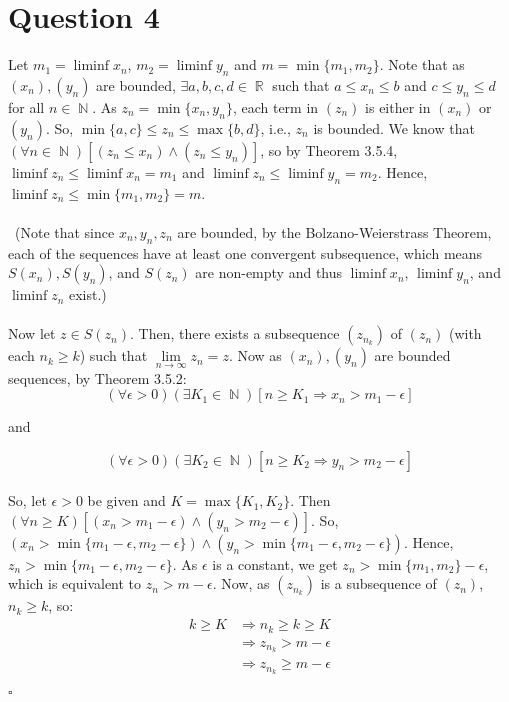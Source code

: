 \documentclass[a4paper,11pt]{article}
\renewenvironment{proof}{{\bfseries Proof.}}{\hfill $\square$}
\DeclareMathOperator{\R}{\mathbb{R}}
\DeclareMathOperator{\N}{\mathbb{N}}
\begin{document}
\section{Question 4}
\begin{proof}
Let $m_1 = \liminf x_n$, $m_2 = \liminf y_n$ and $m = \min\{m_1, m_2\}$. Note that as $(x_n), (y_n)$ are bounded, $\exists a, b, c, d \in \R$ such that $a \leq x_n \leq b$ and $c \leq y_n \leq d$ for all $n \in \N$. As $z_n = \min\{x_n, y_n\}$, each term in $(z_n)$ is either in $(x_n)$ or $(y_n)$. So, $\min\{a, c\} \leq z_n \leq \max\{b, d\}$, i.e., $z_n$ is bounded. We know that $(\forall n \in \N)[(z_n \leq x_n) \land (z_n \leq y_n)]$, so by Theorem 3.5.4, $\liminf z_n \leq \liminf x_n  = m_1$ and $\liminf z_n \leq \liminf y_n = m_2$. Hence, $\liminf z_n \leq \min\{m_1, m_2\} = m$. \\\\\ (Note that since $x_n, y_n, z_n$ are bounded, by the Bolzano-Weierstrass Theorem, each of the sequences have at least one convergent subsequence, which means $S(x_n), S(y_n)$, and $S(z_n)$ are non-empty and thus $\liminf x_n$, $\liminf y_n$, and $\liminf z_n$ exist.) \\\\
Now let $z \in S(z_n)$. Then, there exists a subsequence $(z_{n_k})$ of $(z_n)$ (with each $n_k \geq k$) such that $\lim\limits_{n \to \infty}{z_n} = z$. Now as $(x_n), (y_n)$ are bounded sequences, by Theorem 3.5.2: 
$$(\forall \epsilon > 0)(\exists K_1 \in \N)[n \geq K_1 \Rightarrow x_n > m_1-\epsilon]$$ 
\begin{center} and \end{center}
$$(\forall \epsilon > 0)(\exists K_2 \in \N)[n \geq K_2 \Rightarrow y_n > m_2-\epsilon]$$ \\
So, let $\epsilon > 0$ be given and $K = \max\{K_1, K_2\}$. Then $(\forall n \geq K)[(x_n > m_1-\epsilon) \land (y_n > m_2-\epsilon)]$. So, $(x_n > \min\{m_1-\epsilon, m_2-\epsilon\}) \land (y_n > \min\{m_1-\epsilon, m_2-\epsilon\})$. Hence, $z_n > \min\{m_1-\epsilon, m_2-\epsilon\}$. As $\epsilon$ is a constant, we get $z_n > \min\{m_1, m_2\} - \epsilon$, which is equivalent to $z_n > m - \epsilon$. Now, as $(z_{n_k})$ is a subsequence of $(z_n)$, $n_k \geq k$, so:
\begin{align*}
k \geq K &\Rightarrow n_k \geq k \geq K \\
&\Rightarrow z_{n_k} > m - \epsilon \\
&\Rightarrow z_{n_k} \geq m - \epsilon
\end{align*} 

\end{proof}
\end{document}
